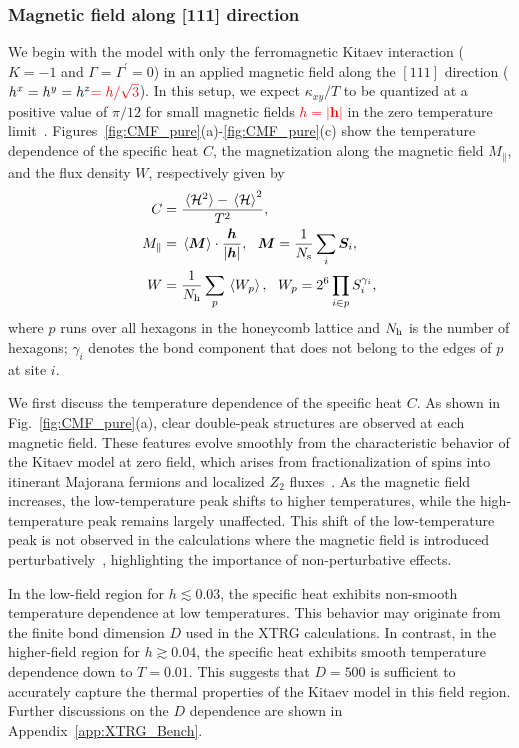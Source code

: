\documentclass[twocolumn,superscriptaddress,showpacs, longbibliography, aps, prx]{revtex4-2}
\def\vec#1{\boldsymbol #1}
\newcommand{\red}[1]{\textcolor{red}{#1}}
\newcommand{\redsout}[1]{\textcolor{red}{\sout{#1}}}
\begin{document}
\subsubsection{Magnetic field along [111] direction}\label{subsec:pureKitaev_h111}
We begin with the model with only the ferromagnetic Kitaev interaction ($K=-1$ and $\Gamma = \Gamma^\prime = 0$) in an applied magnetic field along the $[111]$ direction ($h^x=h^y=h^z\red{=h/\sqrt{3}}$). 
In this setup, we expect $\kappa_{xy}/T$ to be quantized at a positive value of $\pi/12$ for small magnetic fields \redsout{$h = |\vec{h}|$} in the zero temperature limit~\cite{Kitaev2006}. 
Figures~\ref{fig:CMF_pure}(a)-\ref{fig:CMF_pure}(c) show the temperature dependence of the specific heat $C$, the magnetization along the magnetic field $M_{\parallel}$, and the flux density $W$, respectively given by
\begin{align}
C&=\frac{\ev*{{\cal H}^{2}}-\ev*{{\cal H}}^2}{T^2}, \label{eq:C}\\
M_{\parallel}&=\ev*{\vec{M}}
\cdot\frac{\vec{h}}{|\vec{h}|},~~\vec{M}=\frac{1}{N_{\rm s}}\sum_{i}\vec{S}_{i}, \label{eq:Mag}\\
W&=\frac{1}{N_{\rm h}}\sum_{p}\ev*{W_{p}}, 
~~W_{p}=2^6\prod_{i\in p}S^{\gamma_{i}}_{i} \label{eq:W},
\end{align}
where $p$ runs over all hexagons in the honeycomb lattice and $N_{\rm h}$ is the number of hexagons; $\gamma_{i}$ denotes the bond component that does not belong to the edges of $p$ at site $i$.

We first discuss the temperature dependence of the specific heat $C$.
As shown in Fig.~\ref{fig:CMF_pure}(a), clear double-peak structures are observed at each magnetic field.
These features evolve smoothly from the characteristic behavior of the Kitaev model at zero field, which arises from fractionalization of spins into itinerant Majorana fermions and localized $Z_2$ fluxes~\cite{NasuUM2014,NasuUM2015}.
As the magnetic field increases, the low-temperature peak shifts to higher temperatures, while the high-temperature peak remains largely unaffected. 
This shift of the low-temperature peak is not observed in the calculations where the magnetic field is introduced perturbatively~\cite{NasuYM2017}, highlighting the importance of non-perturbative effects.

In the low-field region for $h\lesssim 0.03$, the specific heat exhibits non-smooth temperature dependence at low temperatures. 
This behavior may originate from the finite bond dimension $D$ used in the XTRG calculations. 
In contrast, in the higher-field region for $h \gtrsim 0.04$, the specific heat exhibits smooth temperature dependence down to $T=0.01$. 
This suggests that $D=500$ is sufficient to accurately capture the thermal properties of the Kitaev model in this field region. 
Further discussions on the $D$ dependence are shown in Appendix~\ref{app:XTRG_Bench}. 
\end{document}

